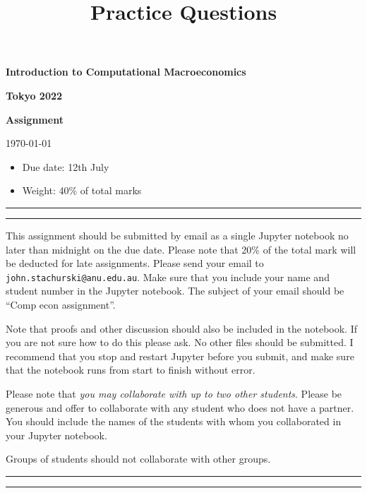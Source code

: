 \documentclass[12pt]{article}
\newcommand{\1}{\mathbbm 1}
\theoremstyle{definition}
\begin{document}
\title{Practice Questions}

\date{}


\begin{center}

    {\bf {\Large Introduction to Computational Macroeconomics}}

    \bigskip
    {\bf {\Large Tokyo 2022}}

    \bigskip
    {\bf {\Large Assignment}}

    \today
\end{center}

\begin{itemize}
    \item Due date: 12th July
    \item Weight: 40\% of total marks
\end{itemize}

\vspace{1em}
\hrule
\vspace{1em}
\hrule
\vspace{1em}

This assignment should be submitted by email as a single Jupyter notebook no
later than midnight on the due date.  Please note that 20\% of the total mark
will be deducted for late assignments.  Please send your email to
\texttt{john.stachurski@anu.edu.au}.  Make sure that you include your {\sc
name and student number} in the Jupyter notebook.  The subject of your email
should be ``Comp econ assignment''.

Note that proofs and other discussion should also be included in the notebook.
If you are not sure how to do this please ask.  No other files should be
submitted.  I recommend that you stop and restart Jupyter before you submit,
and make sure that the notebook runs from start to finish without error.

Please note that \emph{you may collaborate with up to two other students}.
Please be generous and offer to collaborate with any student who does not have
a partner.  You should include the names of the students with whom you
collaborated in your Jupyter notebook.

Groups of students should not collaborate with other groups.

\vspace{1em}
\vspace{1em}
\vspace{1em}
\hrule
\vspace{1em}
\hrule
\vspace{1em}
\end{document}
